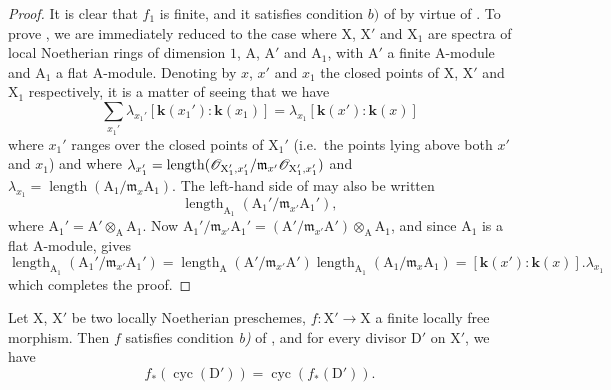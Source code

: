 \begin{proof}
It is clear that $f_1$ is finite, and it satisfies condition $b)$ of  by virtue of .
To prove , we are immediately reduced to the case where $\mathrm{X}$, $\mathrm{X}'$ and $\mathrm{X}_1$ are spectra of local Noetherian rings of dimension $1$, $\mathrm{A}$, $\mathrm{A}'$ and $\mathrm{A}_1$, with $\mathrm{A}'$ a finite A-module and $\mathrm{A}_1$ a flat A-module.
Denoting by $x$, $x'$ and $x_1$ the closed points of $\mathrm{X}$, $\mathrm{X}'$ and $\mathrm{X}_1$ respectively, it is a matter of seeing that we have
\[
\label{IV.21.10.16.2}
  \sum_{x_1'}\lambda_{x_1'}[\boldsymbol{k}(x_1'):\boldsymbol{k}(x_1)]=\lambda_{x_1}[\boldsymbol{k}(x'):\boldsymbol{k}(x)]
  \tag{21.10.16.2}
\]
where $x_1'$ ranges over the closed points of $\mathrm{X}_1'$ (i.e.\ the points lying above both $x'$ and $x_1$) and where $\lambda_{x_1'}=\operatorname{length}(\mathscr{O}_{\mathrm{X}_1',x_1'}/\mathfrak{m}_{x'}\mathscr{O}_{\mathrm{X}_1',x_1'})$ and $\lambda_{x_1}=\operatorname{length}(\mathrm{A}_1/\mathfrak{m}_x\mathrm{A}_1)$.
The left-hand side of  may also be written
\[
  \operatorname{length}_{\mathrm{A}_1}(\mathrm{A}_1'/\mathfrak{m}_{x'}\mathrm{A}_1'),
\]
where $\mathrm{A}_1'=\mathrm{A}'\otimes_{\mathrm{A}}\mathrm{A}_1$.
Now $\mathrm{A}_1'/\mathfrak{m}_{x'}\mathrm{A}_1'=(\mathrm{A}'/\mathfrak{m}_{x'}\mathrm{A}')\otimes_{\mathrm{A}}\mathrm{A}_1$, and since $\mathrm{A}_1$ is a flat A-module,  gives
\[
  \operatorname{length}_{\mathrm{A}_1}(\mathrm{A}_1'/\mathfrak{m}_{x'}\mathrm{A}_1')
  =\operatorname{length}_{\mathrm{A}}(\mathrm{A}'/\mathfrak{m}_{x'}\mathrm{A}')
   \operatorname{length}_{\mathrm{A}_1}(\mathrm{A}_1/\mathfrak{m}_x\mathrm{A}_1)
  =[\boldsymbol{k}(x'):\boldsymbol{k}(x)].\lambda_{x_1}
\]
which completes the proof.
\end{proof}

\begin{proposition}[21.10.17]
\label{IV.21.10.17}
Let $\mathrm{X}$, $\mathrm{X}'$ be two locally Noetherian preschemes, $f:\mathrm{X}'\to\mathrm{X}$ a finite locally free morphism.
Then $f$ satisfies condition \emph{b)} of , and for every divisor $\mathrm{D}'$ on $\mathrm{X}'$, we have
\[
\label{IV.21.10.17.1}
  f_*(\operatorname{cyc}(\mathrm{D}'))=\operatorname{cyc}(f_*(\mathrm{D}')).
  \tag{21.10.17.1}
\]
\end{proposition}

